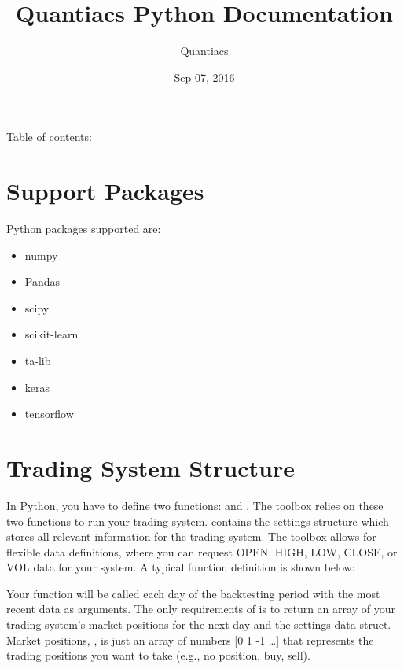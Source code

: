 \documentclass[letterpaper,10pt,english]{sphinxmanual}
\title{Quantiacs Python Documentation}
\date{Sep 07, 2016}
\author{Quantiacs}
\begin{document}
\maketitle
\tableofcontents
{}\label{index::doc}


Table of contents:


\chapter{Support Packages}
\label{packages:welcome-to-quantiacs-python-s-user-guide}\label{packages::doc}\label{packages:support-packages}
Python packages supported are:
\begin{itemize}
\item {} 
numpy

\item {} 
Pandas

\item {} 
scipy

\item {} 
scikit-learn

\item {} 
ta-lib

\item {} 
keras

\item {} 
tensorflow

\end{itemize}


\chapter{Trading System Structure}
\label{ts_structure::doc}\label{ts_structure:trading-system-structure}
In Python, you have to define two functions:  and . The toolbox relies on these two functions to run your trading system.  contains the settings structure which stores all relevant information for the trading system. The toolbox allows for flexible data definitions, where you can request OPEN, HIGH, LOW, CLOSE, or VOL data for your system. A typical function definition is shown below:


\begin{fulllineitems}
\end{fulllineitems}


Your  function will be called each day of the backtesting period with the most recent data as arguments. The only requirements of  is to return an array of your trading system’s market positions for the next day and the settings data struct. Market positions, , is just an array of numbers {[}0 1 -1 …{]} that represents the trading positions you want to take (e.g., no position, buy, sell).
\end{document}
